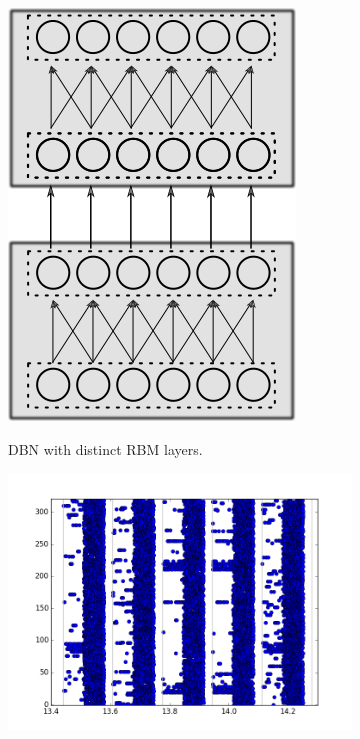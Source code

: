  \begin{figure}[h!]
	\centering
	\begin{subfigure}[t]{.49\textwidth}
  		\centering
  		\includegraphics[width=.4\linewidth]{imgs/spike_dbn.png}
  		\label{fig:sub1}
  		\caption{DBN with distinct RBM layers.}
	\end{subfigure}%
	\begin{subfigure}[t]{.49\textwidth}
  		\centering
  		\includegraphics[width=.9\linewidth]{imgs/app/DBN_sp.png}
  		\label{fig:sub1}
	\end{subfigure}%
	

\end{figure}
